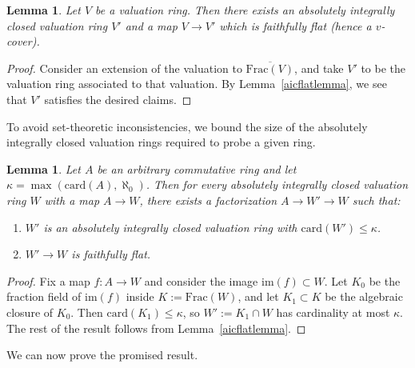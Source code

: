 \documentclass[reqno]{amsart}
\newtheorem{lemma}[theorem]{Lemma}
\theoremstyle{definition}
\begin{document}
\begin{lemma} 
\label{aicvcover}
Let $V$ be a valuation ring. Then there exists an absolutely integrally closed valuation ring $V'$ and a
map $V \to V'$ which is faithfully flat (hence a $v$-cover). 
\end{lemma} 
\begin{proof} 
Consider  
an extension of the valuation to $\overline{\mathrm{Frac}(V)}$, and take $V'$
to be the
valuation ring associated to that valuation. 
By Lemma~\ref{aicflatlemma}, 
we see that 
$V'$ satisfies the desired claims. 
\end{proof}

To avoid set-theoretic inconsistencies, we bound the size of the absolutely integrally closed valuation rings required to probe a given ring. 

\begin{lemma} 
\label{boundcardaic}
Let $A$ be an arbitrary commutative ring and let $\kappa = \max(
\mathrm{card}(A), \aleph_0)$. 
Then for every absolutely integrally closed valuation ring $W$ with a map $A \to W$, there exists a
factorization $A \to W' \to W$ such that: 
\begin{enumerate}
\item $W'$ is an absolutely integrally closed valuation ring with $\mathrm{card}(W') \leq \kappa$.  
\item  $W' \to W$ is faithfully flat. 
\end{enumerate}
\end{lemma} 
\begin{proof} 
Fix a map $f\colon  A \to W$ and consider the image $\mathrm{im}(f) \subset W$. 
Let $ K_0$ be the fraction field of $\mathrm{im}(f)$ inside $K :=
\mathrm{Frac}(W)$, and let $ K_1 \subset K$ be the algebraic closure of $K_0$. 
Then $\mathrm{card}(K_1) \leq \kappa$, so $W' := K_1  \cap W$ has cardinality at
most $\kappa$. The rest of the result follows from
Lemma~\ref{aicflatlemma}. 
\end{proof} 


We can now prove the promised result. 
\end{document}
